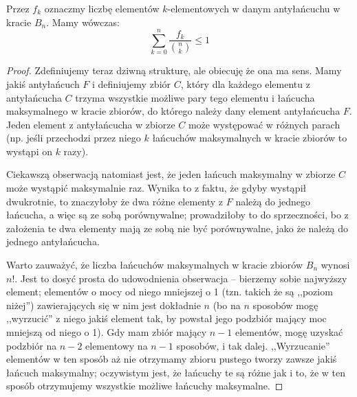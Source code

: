     \begin{theorem}
       Przez $f_k$ oznaczmy liczbę elementów $k$-elementowych w danym antyłańcuchu w kracie $B_n$. Mamy wówczas:
       \begin{equation}
           \sum_{k=0}^{n} \frac{f_k}{\binom{n}{k}} \leq 1 
       \end{equation}
    \end{theorem}

    \begin{proof}
       Zdefiniujemy teraz dziwną strukturę, ale obiecuję że ona ma sens. Mamy jakiś antyłańcuch $F$ i definiujemy zbiór $C$, który dla każdego elementu z antyłańcucha $C$ trzyma wszystkie możliwe pary tego elementu i łańcucha maksymalnego w kracie zbiorów, do którego należy dany element antyłańcucha $F$. Jeden element z antyłańcucha w zbiorze $C$ może występować w różnych parach (np. jeśli przechodzi przez niego $k$ łańcuchów maksymalnych w kracie zbiorów to wystąpi on $k$ razy). 
       
       Ciekawszą obserwacją natomiast jest, że jeden łańcuch maksymalny w zbiorze $C$ może wystąpić maksymalnie raz. Wynika to z faktu, że gdyby wystąpił dwukrotnie, to znaczyłoby że dwa różne elementy z $F$ należą do jednego łańcucha, a więc są ze sobą porównywalne; prowadziłoby to do sprzeczności, bo z założenia te dwa elementy mają ze sobą nie być porównywalne, jako że należą do jednego antyłańcucha. 

       Warto zauważyć, że liczba łańcuchów maksymalnych w kracie zbiorów \(B_n\) wynosi $n!$. Jest to dosyć prosta do udowodnienia obserwacja -- bierzemy sobie najwyższy element; elementów o mocy od niego mniejszej o 1 (tzn. takich że są ,,poziom niżej'') zawierających się w nim jest dokładnie $n$ (bo na $n$ sposobów mogę ,,wyrzucić'' z niego jakiś element tak, by powstał jego podzbiór mający moc mniejszą od niego o 1). Gdy mam zbiór mający $n-1$ elementów, mogę uzyskać podzbiór na $n-2$ elementowy na \(n-1\) sposobów, i tak dalej. ,,Wyrzucanie'' elementów w ten sposób aż nie otrzymamy zbioru pustego tworzy zawsze jakiś łańcuch maksymalny; oczywistym jest, że łańcuchy te są różne jak i to, że w ten sposób otrzymujemy wszystkie możliwe łańcuchy maksymalne. 


\end{proof}
